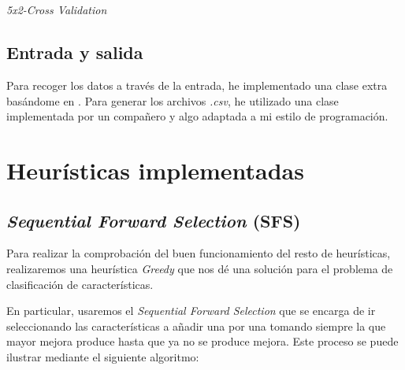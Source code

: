 \documentclass[a4paper, 11pt]{article}
\begin{document}
			\begin{algorithm}[H]
				\begin{algorithmic}[1]
					\REQUIRE \ \\
							 \
							 

										  		
					\ENDFOR
					
				\end{algorithmic}
			\caption{\textit{5x2-Cross Validation}}
			\label{Cross-Validation}
			\end{algorithm}			
			
		\subsection{Entrada y salida}
			Para recoger los datos a través de la entrada, he implementado una clase extra basándome
			en \cite{ARFFReader}.
			Para generar los archivos \textit{.csv}, he utilizado una clase implementada por un
			compañero y algo adaptada a mi estilo de programación.

	\section{Heurísticas implementadas}
		\subsection{\textit{Sequential Forward Selection} (\textbf{SFS})}
			Para realizar la comprobación del buen funcionamiento del resto de heurísticas, realizaremos
			una heurística \textit{Greedy} que nos dé una solución para el problema de clasificación
			de características.
			
			En particular, usaremos el \textit{Sequential Forward Selection} que se encarga de ir
			seleccionando las características a añadir una por una tomando siempre la que mayor mejora
			produce hasta que ya no se produce mejora. Este proceso se puede ilustrar mediante el
			siguiente algoritmo:
\end{document}
